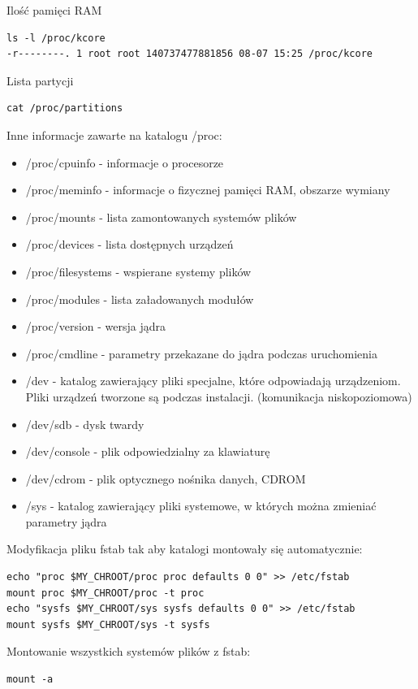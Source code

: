 \newline
Ilość pamięci RAM
\begin{lstlisting}
ls -l /proc/kcore
-r--------. 1 root root 140737477881856 08-07 15:25 /proc/kcore
\end{lstlisting}

\newline
\newpage
Lista partycji
\begin{lstlisting}
cat /proc/partitions	
\end{lstlisting}

Inne informacje zawarte na katalogu /proc:
\begin{itemize}
	\item /proc/cpuinfo - informacje o procesorze
	\item /proc/meminfo - informacje o fizycznej pamięci RAM, obszarze wymiany
	\item /proc/mounts - lista zamontowanych systemów plików
	\item /proc/devices - lista dostępnych urządzeń
	\item /proc/filesystems - wspierane systemy plików
	\item /proc/modules - lista załadowanych modułów
	\item /proc/version - wersja jądra
	\item /proc/cmdline - parametry przekazane do jądra podczas uruchomienia
	\item /dev - katalog zawierający pliki specjalne, które odpowiadają urządzeniom. Pliki urządzeń tworzone są podczas instalacji. (komunikacja niskopoziomowa)
	\item /dev/sdb - dysk twardy
	\item /dev/console  - plik odpowiedzialny za klawiaturę
	\item /dev/cdrom  - plik optycznego nośnika danych, CDROM 
	\item /sys - katalog zawierający pliki systemowe, w których można zmieniać parametry jądra
\end{itemize}
Modyfikacja pliku fstab tak aby katalogi montowały się automatycznie: 

\begin{lstlisting}
echo "proc $MY_CHROOT/proc proc defaults 0 0" >> /etc/fstab
mount proc $MY_CHROOT/proc -t proc
echo "sysfs $MY_CHROOT/sys sysfs defaults 0 0" >> /etc/fstab
mount sysfs $MY_CHROOT/sys -t sysfs
\end{lstlisting}

Montowanie wszystkich systemów plików z fstab:
\begin{lstlisting}
mount -a
\end{lstlisting}

